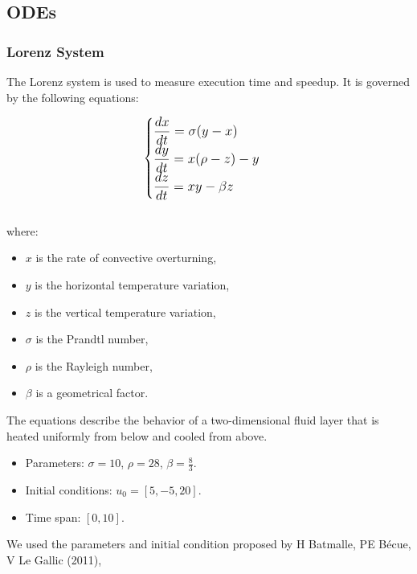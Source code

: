 \documentclass[a4paper,12pt,french]{article}
\begin{document}
\subsection{ODEs}

\subsubsection{Lorenz System}
The Lorenz system \cite{lorenz1963deterministic} is used to measure execution time and speedup. It is governed by the following equations:

\begin{equation}
\large
\begin{cases}
    \displaystyle\frac{dx}{dt} = \sigma(y - x) \\
    \displaystyle\frac{dy}{dt} = x(\rho - z) - y \\
    \displaystyle\frac{dz}{dt} = xy - \beta z
\end{cases}
\normalsize
\end{equation}\\
   
where:
\begin{itemize}
    \item $x$ is the rate of convective overturning,
    \item $y$ is the horizontal temperature variation,
    \item $z$ is the vertical temperature variation,
    \item $\sigma$ is the Prandtl number,
    \item $\rho$ is the Rayleigh number,
    \item $\beta$ is a geometrical factor.
\end{itemize}

The equations describe the behavior of a two-dimensional fluid layer that is heated uniformly from below and cooled from above.\\
   
\begin{itemize}
    \item Parameters: $\sigma=10$, $\rho=28$, $\beta=\frac{8}{3}$.
    \item Initial conditions: $u_0=[5,-5,20]$.
    \item Time span: $[0,10]$.
\end{itemize}

We used the parameters and initial condition proposed by H Batmalle, PE Bécue, V Le Gallic (2011),\cite{batmalle2011acceleration}
\end{document}
